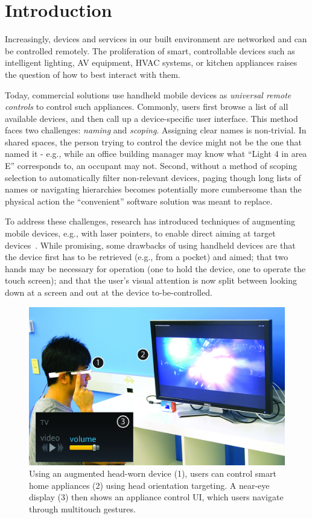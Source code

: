 \section{Introduction}
Increasingly, devices and services in our built environment are networked and can be controlled remotely. The proliferation of smart, controllable devices such as intelligent lighting, AV equipment, HVAC systems, or kitchen appliances raises the question of how to best interact with them. 

Today, commercial solutions use handheld mobile devices as {\em universal remote controls} to control such appliances. Commonly, users first browse a list of all available devices, and then call up a device-specific user interface. This method faces two challenges: {\em naming} and {\em scoping}. Assigning clear names is non-trivial. In shared spaces, the person trying to control the device might not be the one that named it - e.g., while an office building manager may know what ``Light 4 in area E'' corresponds to, an occupant may not. Second, without a method of scoping selection to automatically filter non-relevant devices, paging though long lists of names or navigating hierarchies becomes potentially more cumbersome than the physical action the ``convenient'' software solution was meant to replace.

To address these challenges, research has introduced techniques of augmenting mobile devices, e.g., with laser pointers, to enable direct aiming at target devices~\cite{beigl_point_1999,patel_2-way_2003}. While promising, some drawbacks of using handheld devices are that the device first has to be retrieved (e.g., from a pocket) and aimed; that two hands may be necessary for operation (one to hold the device, one to operate the touch screen); and that the user's visual attention is now split between looking down at a screen and out at the device to-be-controlled. 

\begin{figure}[t]
\centering
\includegraphics[width=1.0\columnwidth]{figures/teaser.jpg}
\caption{Using an augmented head-worn device (1), users can control smart home appliances (2) using head orientation targeting. A near-eye display (3) then shows an appliance control UI, which users navigate through multitouch gestures.}
\label{fig:teaser}
\end{figure}

